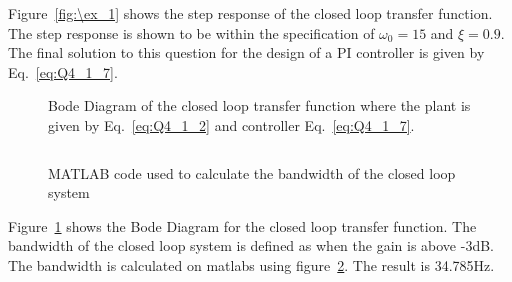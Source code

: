 Figure~\ref{fig:\ex_1} shows the step response of the closed loop transfer function. The step response is shown to be within the specification of $\omega_0 = 15$ and $\xi = 0.9$.\\

The final solution to this question for the design of a PI controller is given by Eq.~\eqref{eq:Q4_1_7}.

\begin{figure}[ht!]
    \centering
    
    
    \caption{Bode Diagram of the closed loop transfer function where the plant is given by Eq.~\eqref{eq:Q4_1_2} and controller Eq.~\eqref{eq:Q4_1_7}. \appendixamble{\ex}}
    \label{fig:\ex_2}
\end{figure}\FloatBarrier

\begin{figure}[ht!]
    \centering
    \inputminted[firstline=58,lastline=58]{matlab}{matlab/Q4_1.m}
    \caption{MATLAB code used to calculate the bandwidth of the closed loop system}\label{fig:Q4code1}
\end{figure}\FloatBarrier

Figure~\ref{fig:\ex_2} shows the Bode Diagram for the closed loop transfer function. The bandwidth of the closed loop system is defined as when the gain is above -3dB. The bandwidth is calculated on matlabs using figure~\ref{fig:Q4code1}. The result is 34.785Hz.